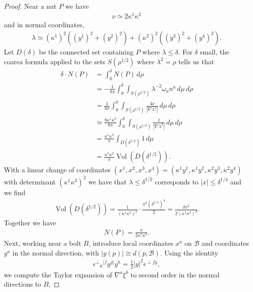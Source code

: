 \documentclass[a4paper,10pt,reqno]{amsart}
\newcommand{\nut}{P}
\newcommand{\bolt}{B}
\newcommand{\cB}{\mathcal{B}}
\theoremstyle{plain}
\newcommand{\eps}{\epsilon}
\numberwithin{equation}{section}
\begin{document}
\begin{proof}
Near a nut $\nut$ we have
\begin{align}
\nu \simeq 2 \kappa^1 \kappa^2
\end{align}
and in normal coordinates,
\begin{align}
\lambda \simeq 
(\kappa^1)^2 \left( (y^1)^2 + (y^2)^2 \right)
+ (\kappa^2)^2 \left( (y^3)^2 + (y^4)^2 \right).
\end{align}
Let $D(\delta)$ be the connected set containing $\nut$ where $\lambda \leq \delta$. For $\delta$ small, the coarea formula applied to the sets $S(\rho^{1/2})$ where $\lambda^2 = \rho$ tells us that
\begin{align}
\delta \cdot N(\nut)
&= \int_0^\delta N(\nut) \, d\rho \nonumber \\
&= -\frac{1}{8\pi} \int_0^\delta 
\int_{S(\rho^{1/2})} \lambda^{-2} \omega_a n^a \, d\mu 
\, d\rho \nonumber \\
&= \frac{1}{8\pi} \int_0^\delta 
\int_{S(\rho^{1/2})} \frac{4\nu}{|\nabla\lambda^2| } \, d\mu 
\, d\rho \nonumber \\
&\simeq 
\frac{8 \kappa^1 \kappa^2}{8\pi} \int_0^\delta 
\int_{S(\rho^{1/2})} \frac{1}{|\nabla \lambda^2|} \, d\mu
\, d\rho \nonumber \\
&= 
\frac{\kappa^1 \kappa^2}{\pi} \int_{D(\delta^{1/2})} 1 \, d\mu \nonumber \\
&= 
\frac{\kappa^1 \kappa^2}{\pi} \operatorname{Vol}(D(\delta^{1/2})).
\end{align} 
With a linear change of coordinates $(x^1,x^2,x^3,x^4) = (\kappa^1 y^1,\kappa^1 y^2,\kappa^2 y^3,\kappa^2 y^4)$ with determinant $(\kappa^1 \kappa^2)^2$ we have that $\lambda \leq \delta^{1/2}$ corresponds to $|x| \leq \delta^{1/4}$ and we find 
\begin{align}
\operatorname{Vol}(D(\delta^{1/2})) 
= \frac{1}{(\kappa^1 \kappa^2)^2} \cdot \frac{\pi^2(\delta^{1/4})^4}{2}
= \frac{\delta \pi^2}{2(\kappa^1 \kappa^2)^2}.
\end{align}
Together we have 
\begin{align}
N(\nut) = \frac{\pi}{2\kappa^1 \kappa^2}.
\end{align}
Next, working near a bolt $\bolt$, introduce local coordinates $x^a$ on $\cB$ and coordinates $y^a$ in the normal direction, with $|y(p)| \cong d(p,\cB)$. Using the identity 
\begin{align}
\eps^{\perp}{}_h{}^{[f} y^{g]} y^h = \frac{1}{2} |y|^2 \eps^{\perp fg},
\end{align}
we compute the Taylor expansion of $\nabla^a \xi^b$ to second order in the normal directions to $\bolt$,

\end{proof}
\end{document}
